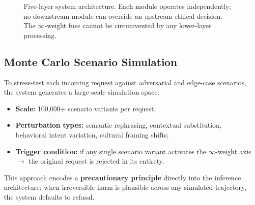 \documentclass[conference]{IEEEtran}
\begin{document}
\begin{figure}[!ht]
\centering
{}
\caption{Five-layer system architecture. Each module operates
  independently; no downstream module can override an upstream
  ethical decision. The $\infty$-weight fuse cannot be
  circumvented by any lower-layer processing.}
\label{fig:architecture}
\end{figure}

\subsection{Monte Carlo Scenario Simulation}

To stress-test each incoming request against adversarial
and edge-case scenarios, the system generates a large-scale
simulation space:
\begin{itemize}
  \item \textbf{Scale:} 100,000+ scenario variants per request;
  \item \textbf{Perturbation types:} semantic rephrasing,
        contextual substitution, behavioral intent variation,
        cultural framing shifts;
  \item \textbf{Trigger condition:} if any single scenario
        variant activates the $\infty$-weight axis $\to$ the
        original request is rejected in its entirety.
\end{itemize}

This approach encodes a \textbf{precautionary principle}
directly into the inference architecture: when irreversible
harm is plausible across any simulated trajectory, the
system defaults to refusal.
\end{document}
